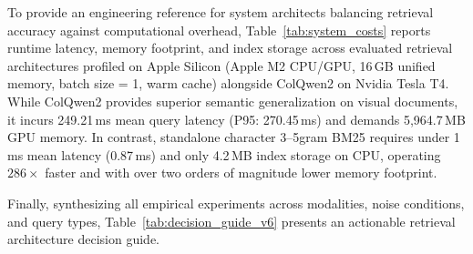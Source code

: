 \documentclass[conference]{IEEEtran}
\begin{document}
To provide an engineering reference for system architects balancing retrieval accuracy against computational overhead, Table~\ref{tab:system_costs} reports runtime latency, memory footprint, and index storage across evaluated retrieval architectures profiled on Apple Silicon (Apple M2 CPU/GPU, 16\,GB unified memory, batch size = 1, warm cache) alongside ColQwen2 on Nvidia Tesla T4. While ColQwen2 provides superior semantic generalization on visual documents, it incurs 249.21\,ms mean query latency (P95: 270.45\,ms) and demands 5,964.7\,MB GPU memory. In contrast, standalone character 3--5gram BM25 requires under 1\,ms mean latency (0.87\,ms) and only 4.2\,MB index storage on CPU, operating $286\times$ faster and with over two orders of magnitude lower memory footprint.

\begin{table}[t]
\centering
\small
\caption{Computational Resource and Latency Profile Across Retrieval Systems ($N=813$ Index Pool, Apple M2 CPU/GPU, 16\,GB RAM, Batch Size = 1, Warm Cache; ColQwen2 Profiled on Nvidia Tesla T4 GPU).}\label{tab:system_costs}
\end{table}

Finally, synthesizing all empirical experiments across modalities, noise conditions, and query types, Table~\ref{tab:decision_guide_v6} presents an actionable retrieval architecture decision guide.
\end{document}
